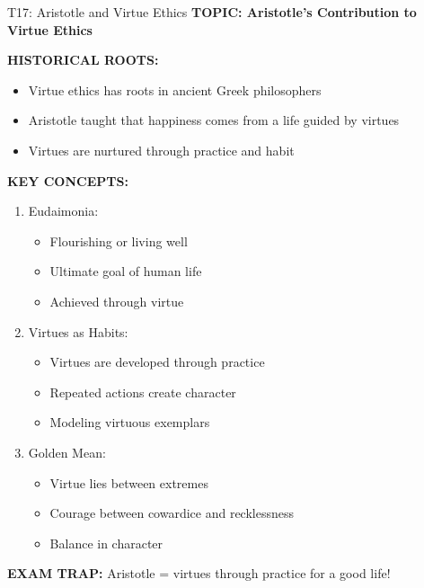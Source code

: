 \documentclass[8pt]{beamer}
\begin{document}
	\begin{frame}{T17: Aristotle and Virtue Ethics}
		\fontsize{6.5}{7.5}\selectfont
		\textbf{TOPIC: Aristotle's Contribution to Virtue Ethics}
		
		\vspace{0.1cm}
		\textbf{HISTORICAL ROOTS:}
		\begin{itemize}
			\item Virtue ethics has roots in ancient Greek philosophers
			\item Aristotle taught that happiness comes from a life guided by virtues
			\item Virtues are nurtured through practice and habit
		\end{itemize}
		
		\vspace{0.1cm}
		\textbf{KEY CONCEPTS:}
		\begin{enumerate}
			\item \textcolor{myblue}{Eudaimonia:}
			\begin{itemize}
				\item Flourishing or living well
				\item Ultimate goal of human life
				\item Achieved through virtue
			\end{itemize}
			\item \textcolor{myblue}{Virtues as Habits:}
			\begin{itemize}
				\item Virtues are developed through practice
				\item Repeated actions create character
				\item Modeling virtuous exemplars
			\end{itemize}
			\item \textcolor{myblue}{Golden Mean:}
			\begin{itemize}
				\item Virtue lies between extremes
				\item Courage between cowardice and recklessness
				\item Balance in character
			\end{itemize}
		\end{enumerate}
		
		\textcolor{myred}{\textbf{EXAM TRAP:}} Aristotle = \textcolor{myblue}{virtues through practice for a good life}!
	\end{frame}
	
\end{document}
